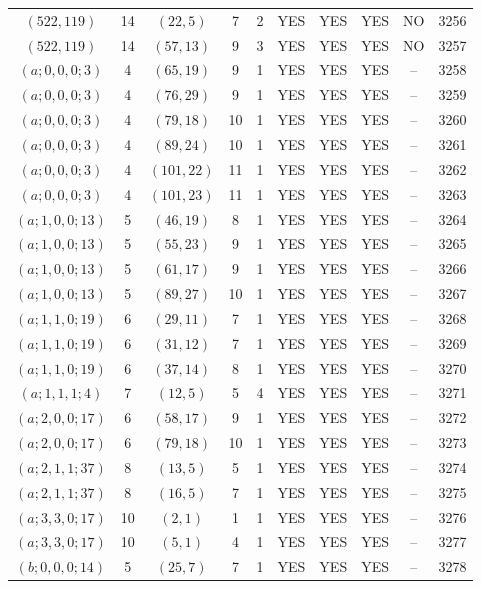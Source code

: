 \begin{longtable}{|c|c|c|c|c|c|c|c|c|c|}
$(522, 119)$ & 14 & $(22, 5)$ & 7 & 2 & YES & YES & YES & NO & 3256\\
$(522, 119)$ & 14 & $(57, 13)$ & 9 & 3 & YES & YES & YES & NO & 3257\\
$(a; 0, 0, 0; 3)$ & 4 & $(65, 19)$ & 9 & 1 & YES & YES & YES & -- & 3258\\
$(a; 0, 0, 0; 3)$ & 4 & $(76, 29)$ & 9 & 1 & YES & YES & YES & -- & 3259\\
$(a; 0, 0, 0; 3)$ & 4 & $(79, 18)$ & 10 & 1 & YES & YES & YES & -- & 3260\\
$(a; 0, 0, 0; 3)$ & 4 & $(89, 24)$ & 10 & 1 & YES & YES & YES & -- & 3261\\
$(a; 0, 0, 0; 3)$ & 4 & $(101, 22)$ & 11 & 1 & YES & YES & YES & -- & 3262\\
$(a; 0, 0, 0; 3)$ & 4 & $(101, 23)$ & 11 & 1 & YES & YES & YES & -- & 3263\\
$(a; 1, 0, 0; 13)$ & 5 & $(46, 19)$ & 8 & 1 & YES & YES & YES & -- & 3264\\
$(a; 1, 0, 0; 13)$ & 5 & $(55, 23)$ & 9 & 1 & YES & YES & YES & -- & 3265\\
$(a; 1, 0, 0; 13)$ & 5 & $(61, 17)$ & 9 & 1 & YES & YES & YES & -- & 3266\\
$(a; 1, 0, 0; 13)$ & 5 & $(89, 27)$ & 10 & 1 & YES & YES & YES & -- & 3267\\
$(a; 1, 1, 0; 19)$ & 6 & $(29, 11)$ & 7 & 1 & YES & YES & YES & -- & 3268\\
$(a; 1, 1, 0; 19)$ & 6 & $(31, 12)$ & 7 & 1 & YES & YES & YES & -- & 3269\\
$(a; 1, 1, 0; 19)$ & 6 & $(37, 14)$ & 8 & 1 & YES & YES & YES & -- & 3270\\
$(a; 1, 1, 1; 4)$ & 7 & $(12, 5)$ & 5 & 4 & YES & YES & YES & -- & 3271\\
$(a; 2, 0, 0; 17)$ & 6 & $(58, 17)$ & 9 & 1 & YES & YES & YES & -- & 3272\\
$(a; 2, 0, 0; 17)$ & 6 & $(79, 18)$ & 10 & 1 & YES & YES & YES & -- & 3273\\
$(a; 2, 1, 1; 37)$ & 8 & $(13, 5)$ & 5 & 1 & YES & YES & YES & -- & 3274\\
$(a; 2, 1, 1; 37)$ & 8 & $(16, 5)$ & 7 & 1 & YES & YES & YES & -- & 3275\\
$(a; 3, 3, 0; 17)$ & 10 & $(2, 1)$ & 1 & 1 & YES & YES & YES & -- & 3276\\
$(a; 3, 3, 0; 17)$ & 10 & $(5, 1)$ & 4 & 1 & YES & YES & YES & -- & 3277\\
$(b; 0, 0, 0; 14)$ & 5 & $(25, 7)$ & 7 & 1 & YES & YES & YES & -- & 3278\\

\end{longtable}
